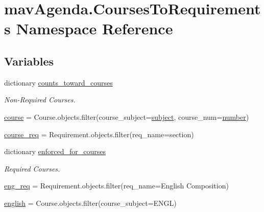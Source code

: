 \hypertarget{namespacemavAgenda_1_1CoursesToRequirements}{}\section{mav\+Agenda.\+Courses\+To\+Requirements Namespace Reference}
\label{namespacemavAgenda_1_1CoursesToRequirements}
\subsection*{Variables}
\begin{DoxyCompactItemize}
\item 
dictionary \mbox{\hyperlink{namespacemavAgenda_1_1CoursesToRequirements_a921d8c4725c512515a269cd5c93346ff}{counts\+\_\+toward\+\_\+courses}}
\begin{DoxyCompactList}\small\item\em Non-\/\+Required Courses. \end{DoxyCompactList}\item 
\mbox{\hyperlink{namespacemavAgenda_1_1CoursesToRequirements_a5f1f1f8ae3b0c76cd6127f1efff347fb}{course}} = Course.\+objects.\+filter(course\+\_\+subject=\mbox{\hyperlink{namespacemavAgenda_1_1CoursesToRequirements_a6b8eea6e735b0b2719a9119de39befec}{subject}}, course\+\_\+num=\mbox{\hyperlink{namespacemavAgenda_1_1CoursesToRequirements_a14f52ce76e8c121c2e688e47bee5bc9c}{number}})
\item 
\mbox{\hyperlink{namespacemavAgenda_1_1CoursesToRequirements_a544a2a7847bda3c0d90036d8dcf27d56}{course\+\_\+req}} = Requirement.\+objects.\+filter(req\+\_\+name=section)
\item 
dictionary \mbox{\hyperlink{namespacemavAgenda_1_1CoursesToRequirements_ae73dd5db36ec9c5e9ef0d4457022cf12}{enforced\+\_\+for\+\_\+courses}}
\begin{DoxyCompactList}\small\item\em Required Courses. \end{DoxyCompactList}\item 
\mbox{\hyperlink{namespacemavAgenda_1_1CoursesToRequirements_a9c2b2fe8d45b47b61c06ecfc704c4b95}{eng\+\_\+req}} = Requirement.\+objects.\+filter(req\+\_\+name=\textquotesingle{}English Composition\textquotesingle{})
\item 
\mbox{\hyperlink{namespacemavAgenda_1_1CoursesToRequirements_ac47922c7a0e06cded34bb418cb06b47f}{english}} = Course.\+objects.\+filter(course\+\_\+subject=\textquotesingle{}E\+N\+GL\textquotesingle{})

\end{DoxyCompactItemize}
